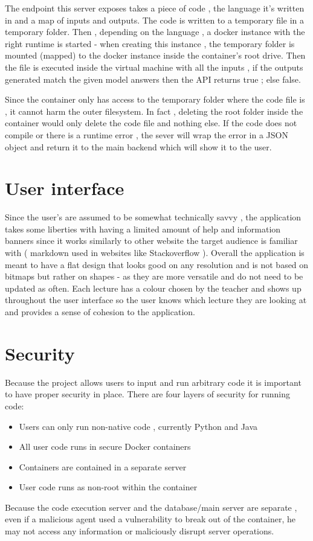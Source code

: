 The endpoint this server exposes takes a piece of code , the language it's written in and a map of inputs and outputs. The code is written to a temporary file in a temporary folder. Then , depending on the language , a docker instance with the right runtime is started - when creating this instance , the temporary folder is mounted (mapped) to the docker instance inside the container's root drive. Then the file is executed inside the virtual machine with all the inputs , if the outputs generated match the given model answers then the API returns true ; else false. 

Since the container only has access to the temporary folder where the code file is , it cannot harm the outer filesystem. In fact , deleting the root folder inside the container would only delete the code file and nothing else.
If the code does not compile or there is a runtime error , the sever will wrap the error in a JSON object and return it to the main backend which will show it to the user.




\section{User interface}
Since the user's are assumed to be somewhat technically savvy , the application takes some liberties with having a limited amount of help and information banners since it works similarly to other website the target audience is familiar with ( markdown used in websites like Stackoverflow \cite{stackoverflow} ).
Overall the application is meant to have a flat design that looks good on any resolution and is not based on bitmaps but rather on shapes - as they are more versatile and do not need to be updated as often.
Each lecture has a colour chosen by the teacher and shows up throughout the user interface so the user knows which lecture they are looking at and provides a sense of cohesion to the application.


\section{Security}
Because the project allows users to input and run arbitrary code it is important to have proper security in place. There are four layers of security for running code:
\begin{itemize}
\item Users can only run non-native code , currently Python and Java
\item 	All user code runs in secure Docker containers
\item	Containers are contained in a separate server
\item User code runs as non-root within the container
\end{itemize}
Because the code execution server and the database/main server are separate , even if a malicious agent used a vulnerability to break out of the container, he may not access any information or maliciously disrupt server operations.

